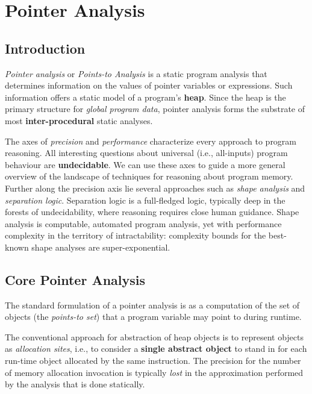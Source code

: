 \chapter{Pointer Analysis}
\label{chap:pointer-analysis}

\section{Introduction}

\textit{Pointer analysis} or \textit{Points-to Analysis} is a static
program analysis that determines information on the values of pointer
variables or expressions.  Such information offers a static model of a
program's \textbf{heap}.  Since the heap is the primary structure for
\textit{global program data}, pointer analysis forms the substrate of
most \textbf{inter-procedural} static analyses.


The axes of \textit{precision} and \textit{performance} characterize
every approach to program reasoning. All interesting questions about
universal (i.e., all-inputs) program behaviour are
\textbf{undecidable}. We can use these axes to guide a more general
overview of the landscape of techniques for reasoning about program
memory. Further along the precision axis lie several approaches such
as \textit{shape analysis} and \textit{separation logic}. Separation
logic is a full-fledged logic, typically deep in the forests of
undecidability, where reasoning requires close human guidance. Shape
analysis is computable, automated program analysis, yet with
performance complexity in the territory of intractability: complexity
bounds for the best-known shape analyses are super-exponential.


\section{Core Pointer Analysis}

The standard formulation of a pointer analysis is as a computation of
the set of objects (the \textit{points-to set}) that a program
variable may point to during runtime.


The conventional approach for abstraction of heap objects is to
represent objects as \textit{allocation sites}, i.e., to consider a
\textbf{single abstract object} to stand in for each run-time object
allocated by the same instruction. The precision for the number of
memory allocation invocation is typically \textit{lost} in the
approximation performed by the analysis that is done statically.


